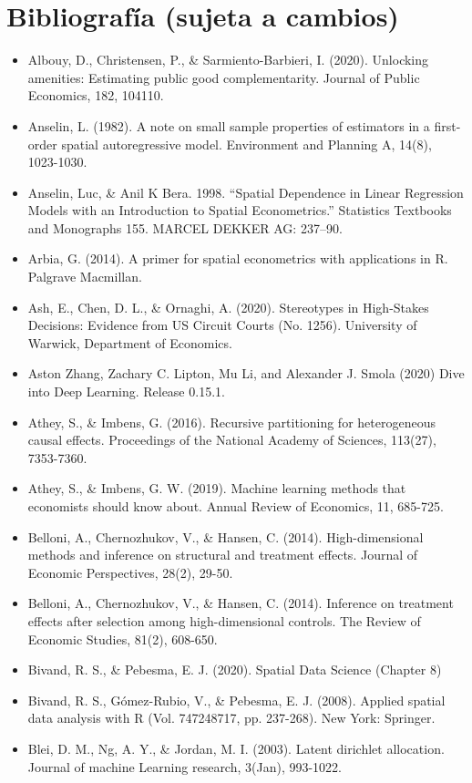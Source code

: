 \documentclass[11pt]{article}
\begin{document}
\section{Bibliografía (sujeta a cambios)}
\begin{itemize}
\item Albouy, D., Christensen, P., \& Sarmiento-Barbieri, I. (2020). Unlocking amenities: Estimating public good complementarity. Journal of Public Economics, 182, 104110.
\item Anselin, L. (1982). A note on small sample properties of estimators in a first-order spatial autoregressive model. Environment and Planning A, 14(8), 1023-1030.
\item Anselin, Luc, \& Anil K Bera. 1998. “Spatial Dependence in Linear Regression Models with an Introduction to Spatial Econometrics.” Statistics Textbooks and Monographs 155. MARCEL DEKKER AG: 237–90.
\item Arbia, G. (2014). A primer for spatial econometrics with applications in R. Palgrave Macmillan.
\item Ash, E., Chen, D. L., \& Ornaghi, A. (2020). Stereotypes in High-Stakes Decisions: Evidence from US Circuit Courts (No. 1256). University of Warwick, Department of Economics.
\item Aston Zhang, Zachary C. Lipton, Mu Li, and Alexander J. Smola (2020) Dive into Deep Learning. Release 0.15.1.
\item Athey, S., \& Imbens, G. (2016). Recursive partitioning for heterogeneous causal effects. Proceedings of the National Academy of Sciences, 113(27), 7353-7360.
\item Athey, S., \& Imbens, G. W. (2019). Machine learning methods that economists should know about. Annual Review of Economics, 11, 685-725.
\item Belloni, A., Chernozhukov, V., \& Hansen, C. (2014). High-dimensional methods and inference on structural and treatment effects. Journal of Economic Perspectives, 28(2), 29-50.
\item Belloni, A., Chernozhukov, V., \& Hansen, C. (2014). Inference on treatment effects after selection among high-dimensional controls. The Review of Economic Studies, 81(2), 608-650.
\item Bivand, R. S.,  \& Pebesma, E. J. (2020). Spatial Data Science (Chapter 8)
\item Bivand, R. S., Gómez-Rubio, V., \& Pebesma, E. J. (2008). Applied spatial data analysis with R (Vol. 747248717, pp. 237-268). New York: Springer.
\item Blei, D. M., Ng, A. Y., \& Jordan, M. I. (2003). Latent dirichlet allocation. Journal of machine Learning research, 3(Jan), 993-1022.

\end{itemize}
\end{document}
